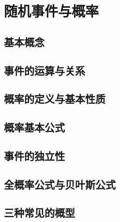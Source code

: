 \chapter{随机事件与概率}

\section{基本概念}
\label{sec:基本概念}

\section{事件的运算与关系}
\label{sec:事件的运算与关系}

\section{概率的定义与基本性质}
\label{sec:概率的定义与基本性质}

\section{概率基本公式}
\label{sec:概率基本公式}

\section{事件的独立性}
\label{sec:事件的独立性}

\section{全概率公式与贝叶斯公式}
\label{sec:全概率公式与贝叶斯公式}

\section{三种常见的概型}
\label{sec:三种常见的概型}

